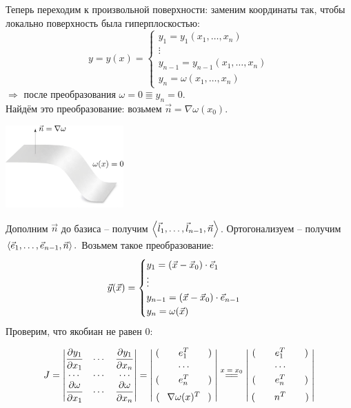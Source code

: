 \documentclass[../main.tex]{subfiles}
\begin{document}
Теперь переходим к произвольной поверхности: заменим координаты так, чтобы локально поверхность была гиперплоскостью:
\[y = y(x) = \begin{cases} y_1 = y_1(x_1,\dots, x_n) \\ \vdots \\ y_{n-1} = y_{n-1}(x_1,\dots,x_n) \\ y_n = \omega(x_1,\dots,x_n) \end{cases} \]
$\Rightarrow$ после преобразования $\omega=0 \Equiv y_n=0$.\\
Найдём это преобразование: возьмем $\vec{n} = \nabla \omega(x_0)$.
\vspace{0.2em}
\begin{center}
\includegraphics[width=0.34\textwidth]{./pic 2_1.pdf}
\end{center}
\vspace{-0.7em} %
Дополним $\vec{n}$ до базиса -- получим $\left\langle \vec{l}_1,\dots,\vec{l}_{n-1},\vec{n} \right\rangle$. Ортогонализуем -- получим $\left\langle \vec{e}_1,\dots,\vec{e}_{n-1},\vec{n} \right\rangle.$ Возьмем такое преобразование:
\[ \vec{y}(\vec{x}) = \begin{cases} y_1 = \left(\vec{x}-\vec{x}_0\right) \cdot \vec{e}_1 \\ \vdots \\ y_{n-1} = \left(\vec{x}-\vec{x}_0\right) \cdot \vec{e}_{n-1} \\ y_n = \omega(\vec{x}) \end{cases}\]
Проверим, что якобиан не равен 0:

$$
J = \begin{vmatrix} 
\pd{y_1}{x_1} & \cdots & \pd{y_1}{x_n} \\
\cdots &\cdots &\cdots \\
\pd{\omega}{x_1} & \cdots & \pd{\omega}{x_n} \end{vmatrix}
= \begin{vmatrix}
\;(\qquad e_1^T \qquad)\;\\[0.2em]
\cdots\\[0.2em]
\;(\qquad e_n^T \qquad)\;\\[0.6em]
\;(\;\;\: \nabla\omega(x)^T \;\;\:)\;
\end{vmatrix}
\overset{\text{$x = x_0$}}{=\joinrel=}
\begin{vmatrix}
    \;(\qquad e_1^T \qquad)\;\\[0.2em]
    \cdots\\[0.2em]
    \;(\qquad e_n^T \qquad)\;\\[0.6em]
    \;(\qquad n^T \qquad)\;
    \end{vmatrix}
$$
\end{document}
